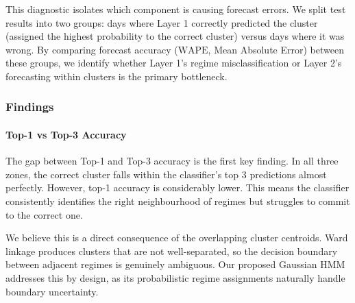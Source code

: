 \documentclass[12pt, a4paper]{article}
\newcommand{\WAPE}{\text{WAPE}}
\begin{document}
This diagnostic isolates which component is causing forecast errors. We split test
results into two groups: days where Layer 1 correctly predicted the cluster
(assigned the highest probability to the correct cluster) versus days where it was
wrong. By comparing forecast accuracy ($\WAPE$, Mean Absolute Error) between
these groups, we identify whether Layer 1's regime misclassification or Layer 2's
forecasting within clusters is the primary bottleneck.

\subsubsection{Findings}


\paragraph{Top-1 vs Top-3 Accuracy}

The gap between Top-1 and Top-3 accuracy is the first key finding. In all three
zones, the correct cluster falls within the classifier's top 3 predictions almost
perfectly. However, top-1 accuracy is considerably lower. This means the
classifier consistently identifies the right neighbourhood of regimes but struggles
to commit to the correct one.

We believe this is a direct consequence of the overlapping cluster centroids. Ward
linkage produces clusters that are not well-separated, so the decision boundary
between adjacent regimes is genuinely ambiguous. Our proposed Gaussian HMM
addresses this by design, as its probabilistic regime assignments naturally handle
boundary uncertainty.
\end{document}
